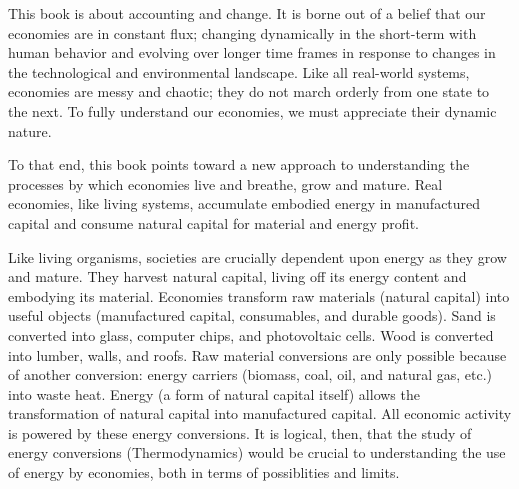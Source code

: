 % 
% 

This book is about accounting and change.
It is borne out of a belief that our economies are in constant flux;
changing dynamically in the short-term with human behavior
and evolving over longer time frames 
in response to changes in 
the technological and environmental landscape.
Like all real-world systems, 
economies are messy and chaotic;
they do not march orderly from one state to the next.
To fully understand our economies,
we must appreciate their dynamic nature.


To that end, this book points toward a new approach 
to understanding the processes by which economies live and breathe,
grow and mature.
Real economies, like living systems,
accumulate embodied energy 
in manufactured capital and
consume natural capital for material and energy profit.

Like living organisms,  
societies are crucially dependent upon energy as they grow and mature.
They harvest natural capital, living off its energy content and
embodying its material.
Economies transform raw materials (natural capital) into useful objects 
(manufactured capital, consumables, and durable goods). 
Sand is converted into glass, computer chips, and photovoltaic cells.
Wood is converted into lumber, walls, and roofs.
Raw material conversions are only possible because of another conversion:
energy carriers (biomass, coal, oil, and natural gas, etc.)
into waste heat.
Energy (a form of natural capital itself) allows the transformation of natural capital
into manufactured capital.
All economic activity is powered by these energy conversions. 
It is logical, then, that the study of energy conversions (Thermodynamics) 
would be crucial to understanding the use of energy by economies,
both in terms of possiblities and limits.

